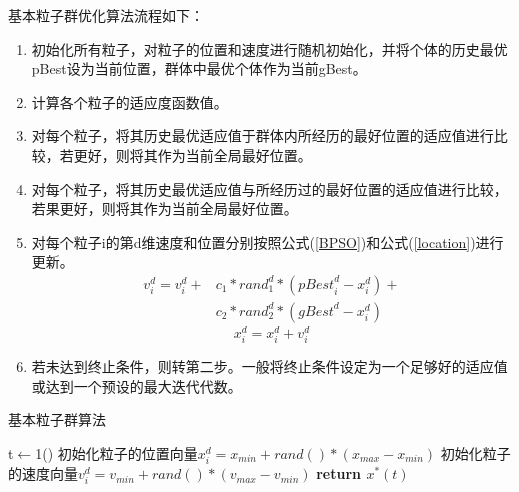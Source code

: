 基本粒子群优化算法流程如下：
\begin{enumerate}
	\item 初始化所有粒子，对粒子的位置和速度进行随机初始化，并将个体的历史最优pBest设为当前位置，群体中最优个体作为当前gBest。
	\item 计算各个粒子的适应度函数值。
	\item 对每个粒子，将其历史最优适应值于群体内所经历的最好位置的适应值进行比较，若更好，则将其作为当前全局最好位置。
	\item 对每个粒子，将其历史最优适应值与所经历过的最好位置的适应值进行比较，若果更好，则将其作为当前全局最好位置。
	\item 对每个粒子i的第d维速度和位置分别按照公式(\ref{BPSO})和公式(\ref{location})进行更新。
	\begin{equation}
	\begin{split}
	\label{BPSO}
	v_i^d=v_i^d+&c_1*{rand}_1^d*({pBest}_i^d-x_i^d )+\\
	&c_2*{rand}_2^d*({gBest}^d-x_i^d)
	\end{split}
	\end{equation}
	\begin{equation}
	\label{location}
	x_i^d=x_i^d+v_i^d
	\end{equation}
	
	\item 若未达到终止条件，则转第二步。一般将终止条件设定为一个足够好的适应值或达到一个预设的最大迭代代数。






\end{enumerate}

\renewcommand{\algorithmcfname}{算法}%
\begin{algorithm}[H]
	\caption{基本粒子群算法}
	t$\gets$1()\;
	初始化粒子的位置向量\qquad$x_i^d=x_{min}+rand()*(x_{max}-x_{min})$\;
	初始化粒子的速度向量\qquad$v_i^d=v_{min}+rand()*(v_{max}-v_{min})$\;
	\textbf{return $x^*(t)$}\;
\end{algorithm}

